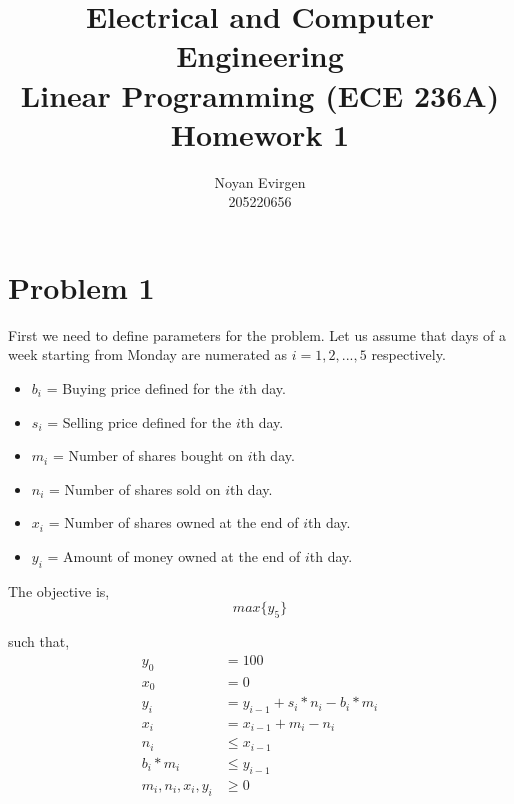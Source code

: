 \documentclass[]{report}
\title{Electrical and Computer Engineering \\
	Linear Programming (ECE 236A)\\
	Homework 1
	}
\author{Noyan Evirgen \\	
		205220656}
\begin{document}
\maketitle

\chapter{Problem 1}

First we need to define parameters for the problem. Let us assume that days of a week starting from Monday are numerated as $i = 1,2,...,5$ respectively.  

\begin{itemize}
	\item $b_i$ = Buying price defined for the $i$th day.
	\item $s_i$ = Selling price defined for the $i$th day.
	\item $m_i$ = Number of shares bought on $i$th day.
	\item $n_i$ = Number of shares sold on $i$th day.
	\item $x_i$ = Number of shares owned at the end of $i$th day.
	\item $y_i$ = Amount of money owned at the end of $i$th day. 
\end{itemize}

The objective is,
\begin{equation}
	max \{y_5\}
\end{equation}

such that,
\begin{equation}
\begin{split}
y_0 &= 100 \\
x_0 &= 0 \\
y_i &= y_{i-1} + s_i*n_i - b_i*m_i \\
x_i &= x_{i-1} + m_i - n_i \\
n_i & \leq x_{i-1} \\
b_i*m_i &\leq y_{i-1} \\
m_i, n_i, x_i, y_i &\geq 0
\end{split}
\end{equation}
\end{document}
